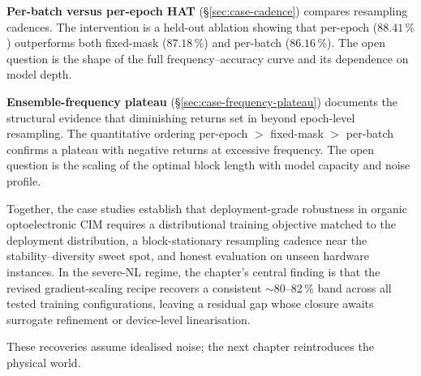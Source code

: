 \textbf{Per-batch versus per-epoch HAT} (\S\ref{sec:case-cadence}) compares resampling cadences.  The intervention is a held-out ablation showing that per-epoch ($88.41\,\%$) outperforms both fixed-mask ($87.18\,\%$) and per-batch ($86.16\,\%$).  The open question is the shape of the full frequency--accuracy curve and its dependence on model depth.

\textbf{Ensemble-frequency plateau} (\S\ref{sec:case-frequency-plateau}) documents the structural evidence that diminishing returns set in beyond epoch-level resampling.  The quantitative ordering per-epoch $>$ fixed-mask $>$ per-batch confirms a plateau with negative returns at excessive frequency.  The open question is the scaling of the optimal block length with model capacity and noise profile.

Together, the case studies establish that deployment-grade robustness in organic optoelectronic CIM requires a distributional training objective matched to the deployment distribution, a block-stationary resampling cadence near the stability--diversity sweet spot, and honest evaluation on unseen hardware instances.  In the severe-NL regime, the chapter's central finding is that the revised gradient-scaling recipe recovers a consistent $\sim$80--82\,\% band across all tested training configurations, leaving a residual gap whose closure awaits surrogate refinement or device-level linearisation.

These recoveries assume idealised noise; the next chapter reintroduces the physical world.

